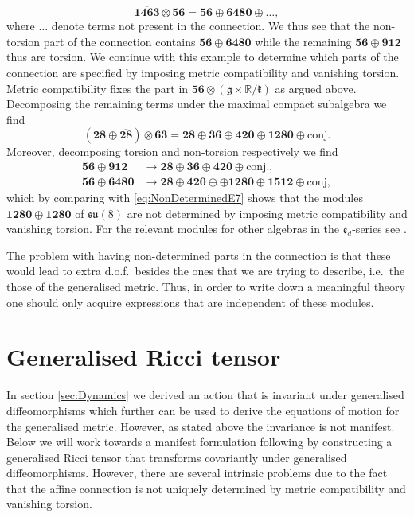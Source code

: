 \begin{equation}
    \overbar{\mathbf{1463}}\otimes\mathbf{56} = \mathbf{56}\oplus\mathbf{6480}\oplus\ldots,
\end{equation}
where $\ldots$ denote terms not present in the connection. We thus see that the non-torsion part of the connection contains $\mathbf{56}\oplus \mathbf{6480}$ while the remaining $\mathbf{56}\oplus\mathbf{912}$ thus are torsion. We continue with this example to determine which parts of the connection are specified by imposing metric compatibility and vanishing torsion. Metric compatibility fixes the part in $\mathbf{56}\otimes(\mathfrak{g}\times\mathbb{R}/\mathfrak{k})$ as argued above. Decomposing the remaining terms under the maximal compact subalgebra we find 
\begin{equation}\label{eq:NonDeterminedE7}
    \left(\mathbf{28}\oplus\overbar{\mathbf{28}}\right)\otimes\mathbf{63} = \mathbf{28}\oplus\mathbf{36}\oplus\mathbf{420}\oplus\mathbf{1280}\oplus \text{conj.}
\end{equation}
Moreover, decomposing torsion and non-torsion respectively we find  
\begin{equation}
    \begin{aligned}
        \mathbf{56}\oplus\mathbf{912}&\to \mathbf{28}\oplus\mathbf{36}\oplus\mathbf{420}\oplus\text{conj.},\\
        \mathbf{56}\oplus\mathbf{6480}&\to\mathbf{28}\oplus\mathbf{420}\oplus\oplus\mathbf{1280}\oplus\mathbf{1512}\oplus\text{conj},
    \end{aligned}
\end{equation}
which by comparing with \eqref{eq:NonDeterminedE7} shows that the modules $\mathbf{1280}\oplus\overbar{\mathbf{1280}}$ of $\mathfrak{su}(8)$ are not determined by imposing metric compatibility and vanishing torsion. For the relevant modules for other algebras in the $\mathfrak{e}_{d}$-series see \cite{Cederwall:2013naa}. 

The problem with having non-determined parts in the connection is that these would lead to extra d.o.f.\ besides the ones that we are trying to describe, i.e.\ the those of the generalised metric. Thus, in order to write down a meaningful theory one should only acquire expressions that are independent of these modules.





\section{Generalised Ricci tensor}
In section \ref{sec:Dynamics} we derived an action that is invariant under generalised diffeomorphisms which further can be used to derive the equations of motion for the generalised metric. However, as stated above the invariance is not manifest. Below we will work towards a manifest formulation following \cite{Cederwall:2013naa} by constructing a generalised Ricci tensor that transforms covariantly under generalised diffeomorphisms. However, there are several intrinsic problems due to the fact that the affine connection is not uniquely determined by metric compatibility and vanishing torsion. 

